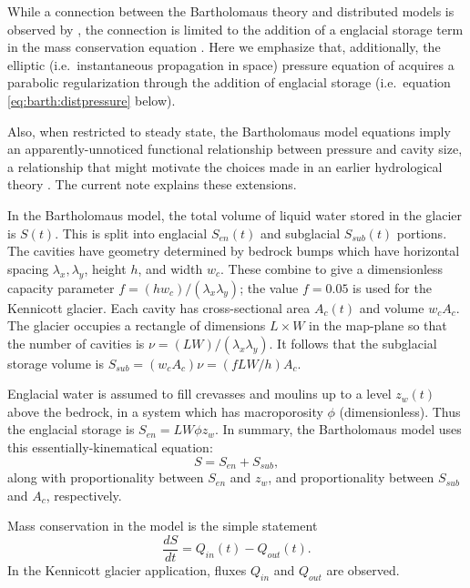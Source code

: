 \documentclass[twocolumn,letterpaper]{igs}
\begin{document}
While a connection between the Bartholomaus theory and distributed models is observed by \cite{Hewitt2013}, the connection is limited to the addition of a englacial storage term in the mass conservation equation \cite[equation (7)]{Hewitt2013}.  Here we emphasize that, additionally, the elliptic (i.e.~instantaneous propagation in space) pressure equation of \cite{Schoofetal2012} acquires a parabolic regularization through the addition of englacial storage (i.e.~equation \eqref{eq:barth:distpressure} below).

Also, when restricted to steady state, the Bartholomaus model equations imply an apparently-unnoticed functional relationship between pressure and cavity size, a relationship that might motivate the choices made in an earlier hydrological theory \citep{FlowersClarke2002_theory}.  The current note explains these extensions.
 
In the Bartholomaus model, the total volume of liquid water stored in the glacier is $S(t)$.  This is split into englacial $S_{en}(t)$ and subglacial $S_{sub}(t)$ portions.  The cavities have geometry determined by bedrock bumps which have horizontal spacing $\lambda_x,\lambda_y$, height $h$, and width $w_c$.  These combine to give a dimensionless capacity parameter $f=(h w_c)/(\lambda_x \lambda_y)$; the value $f=0.05$ is used for the Kennicott glacier.  Each cavity has cross-sectional area $A_c(t)$ and volume $w_c A_c$.  The glacier occupies a rectangle of dimensions $L\times W$ in the map-plane so that the number of cavities is $\nu = (LW)/(\lambda_x\lambda_y)$.  It follows that the subglacial storage volume is $S_{sub} = (w_c A_c) \nu = (f L W/h) A_c$.

Englacial water is assumed to fill crevasses and moulins up to a level $z_w(t)$ above the bedrock, in a system which has macroporosity $\phi$ (dimensionless).  Thus the englacial storage is $S_{en}=L W \phi z_w$.  In summary, the Bartholomaus model uses this essentially-kinematical equation:
\begin{equation}
S = S_{en} + S_{sub},  \label{eq:barth:kinematics}
\end{equation}
along with proportionality between $S_{en}$ and $z_w$, and proportionality between $S_{sub}$ and $A_c$, respectively.
 
Mass conservation in the model is the simple statement \citep{Bartholomausetal2008}
\begin{equation}
\frac{dS}{dt} = Q_{in}(t) - Q_{out}(t). \label{eq:barth:massconserve}
\end{equation}
In the Kennicott glacier application, fluxes $Q_{in}$ and $Q_{out}$ are observed.
\end{document}
